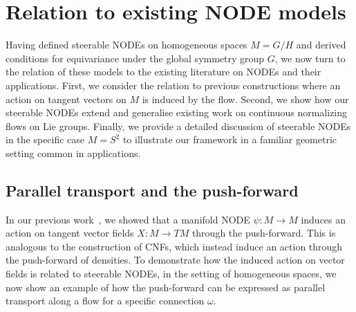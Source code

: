 \documentclass[12pt,a4paper]{article}
\numberwithin{equation}{section}
\theoremstyle{plain}
\theoremstyle{definition}
\theoremstyle{remark}
\begin{document}
\section{Relation to existing NODE models}\label{sec:existingNODEs}
Having defined steerable NODEs on homogeneous spaces $M=G/H$ and derived conditions for equivariance under the global symmetry group $G$, we now turn to the relation of these models to the existing literature on NODEs and their applications. First, we consider the relation to previous constructions where an action on tangent vectors on $M$ is induced by the flow. Second, we show how our steerable NODEs extend and generalise existing work on continuous normalizing flows on Lie groups. Finally, we provide a detailed discussion of steerable NODEs in the specific case $M = S^2$ to illustrate our framework in a familiar geometric setting common in applications.

\subsection{Parallel transport and the push-forward}\label{sec:parallel_transport_push_forward}
In our previous work~\cite{Andersdotter2025}, we showed that a manifold NODE $\psi:M\to M$ induces an action on tangent vector fields $X:M\to TM$ through the push-forward. This is analogous to the construction of CNFs, which instead induce an action through the push-forward of densities. To demonstrate how the induced action on vector fields is related to steerable NODEs, in the setting of homogeneous spaces, we now show an example of how the push-forward can be expressed as parallel transport along a flow for a specific connection $\omega$. 
\end{document}
